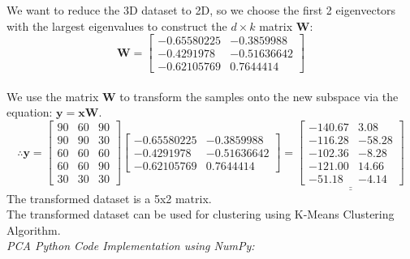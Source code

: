 \documentclass{book}
\begin{document}
We want to reduce the 3D dataset to 2D, so we choose the first 2 eigenvectors with the largest eigenvalues to construct the \(d \times k\) matrix \(\mathbf{W}\):
\[
    \mathbf{W} = \begin{bmatrix}
        -0.65580225 & -0.3859988\\
        -0.4291978 & -0.51636642\\
        -0.62105769 & 0.7644414
    \end{bmatrix}
\]
\\
We use the matrix \(\mathbf{W}\) to transform the samples onto the new subspace via the equation: \(\mathbf{y} = \mathbf{xW}\).\\
\[
    \therefore \mathbf{y} = \begin{bmatrix}
        90 & 60 & 90\\
        90 & 90 & 30\\
        60 & 60 & 60\\
        60 & 60 & 90\\
        30 & 30 & 30
    \end{bmatrix} \begin{bmatrix}
        -0.65580225 & -0.3859988\\
        -0.4291978 & -0.51636642\\
        -0.62105769 & 0.7644414
    \end{bmatrix} = \underline{\underline{\begin{bmatrix}
        -140.67 & 3.08\\
        -116.28 & -58.28\\
        -102.36 & -8.28\\
        -121.00 & 14.66\\
        -51.18 & -4.14
    \end{bmatrix}}}
\]
The transformed dataset is a 5x2 matrix.\\
The transformed dataset can be used for clustering using K-Means Clustering Algorithm.\\
\newpage
\textit{\large{PCA Python Code Implementation using NumPy:}}\\
\end{document}
